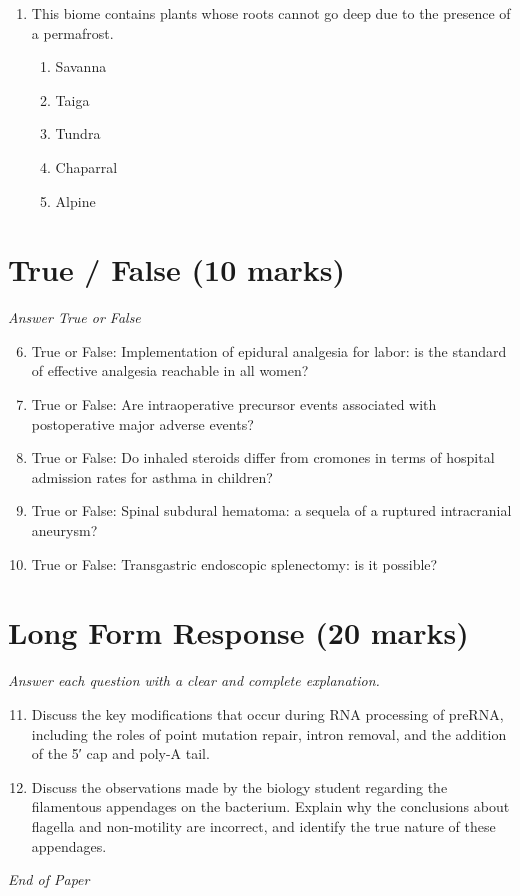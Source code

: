 \documentclass[12pt]{article}
\begin{document}
\begin{enumerate}[label=\arabic*.]
\begin{enumerate}[label=(\alph*)]
    \item blastoderm
    \item mesoderm
    \item amnion
    \item zona pellucida
    \item ectoderm
\end{enumerate}
\item This biome contains plants whose roots cannot go deep due to the presence of a permafrost.
\begin{enumerate}[label=(\alph*)]
    \item Savanna
    \item Taiga
    \item Tundra
    \item Chaparral
    \item Alpine
\end{enumerate}
\end{enumerate}

\section*{True / False (10 marks)}
\textit{Answer True or False}
\begin{enumerate}[label=\arabic*.]
\setcounter{enumi}{5}
\item True or False: Implementation of epidural analgesia for labor: is the standard of effective analgesia reachable in all women?
\item True or False: Are intraoperative precursor events associated with postoperative major adverse events?
\item True or False: Do inhaled steroids differ from cromones in terms of hospital admission rates for asthma in children?
\item True or False: Spinal subdural hematoma: a sequela of a ruptured intracranial aneurysm?
\item True or False: Transgastric endoscopic splenectomy: is it possible?
\end{enumerate}

\section*{Long Form Response (20 marks)}
\textit{Answer each question with a clear and complete explanation.}
\begin{enumerate}[label=\arabic*.]
\setcounter{enumi}{10}
\item Discuss the key modifications that occur during RNA processing of preRNA, including the roles of point mutation repair, intron removal, and the addition of the 5′ cap and poly-A tail.
\item Discuss the observations made by the biology student regarding the filamentous appendages on the bacterium. Explain why the conclusions about flagella and non-motility are incorrect, and identify the true nature of these appendages.
\end{enumerate}

\vfill
\noindent\textit{End of Paper}
\end{document}
